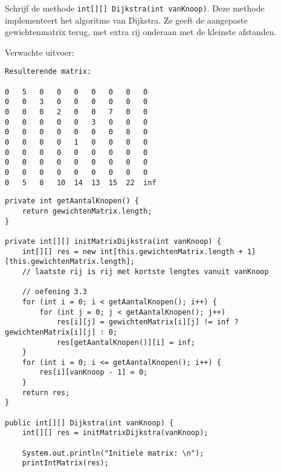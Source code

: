 \begin{oef}
\code Schrijf de methode \verb/int[][] Dijkstra(int vanKnoop)/. Deze methode implementeert het algoritme van Dijkstra. Ze geeft de aangepaste gewichtenmatrix terug, met extra rij onderaan met de kleinste afstanden.

Verwachte uitvoer:
\begin{lstlisting}
Resulterende matrix: 

0	5	0	0	0	0	0	0	0	
0	0	3	0	0	0	0	0	0	
0	0	0	2	0	0	7	0	0	
0	0	0	0	0	3	0	0	0	
0	0	0	0	0	0	0	8	0	
0	0	0	0	1	0	0	0	0	
0	0	0	0	0	0	0	0	0	
0	0	0	0	0	0	0	0	0	
0	0	0	0	0	0	0	0	0	
0	5	8	10	14	13	15	22	inf	
\end{lstlisting}
\begin{opl}
\begin{lstlisting}[caption={Dijkstra}, label=Dijkstra]
private int getAantalKnopen() {
    return gewichtenMatrix.length;
}

private int[][] initMatrixDijkstra(int vanKnoop) {
    int[][] res = new int[this.gewichtenMatrix.length + 1][this.gewichtenMatrix.length];
    // laatste rij is rij met kortste lengtes vanuit vanKnoop

    // oefening 3.3
    for (int i = 0; i < getAantalKnopen(); i++) {
        for (int j = 0; j < getAantalKnopen(); j++)
            res[i][j] = gewichtenMatrix[i][j] != inf ? gewichtenMatrix[i][j] : 0;
            res[getAantalKnopen()][i] = inf;
    }
    for (int i = 0; i <= getAantalKnopen(); i++) {
        res[i][vanKnoop - 1] = 0;
    }
    return res;
}

public int[][] Dijkstra(int vanKnoop) {
    int[][] res = initMatrixDijkstra(vanKnoop);

    System.out.println("Initiele matrix: \n");
    printIntMatrix(res);


\end{lstlisting}
\end{opl}
\end{oef}
